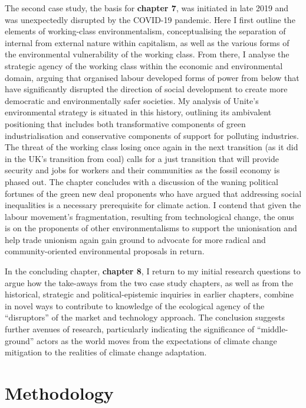 \documentclass[a4paper, nobind]{templates/ociamthesis}
\begin{document}
The second case study, the basis for \textbf{chapter 7}, was initiated in late 2019 and was unexpectedly disrupted by the COVID-19 pandemic. Here I first outline the elements of working-class environmentalism, conceptualising the separation of internal from external nature within capitalism, as well as the various forms of the environmental vulnerability of the working class. From there, I analyse the strategic agency of the working class within the economic and environmental domain, arguing that organised labour developed forms of power from below that have significantly disrupted the direction of social development to create more democratic and environmentally safer societies. My analysis of Unite's environmental strategy is situated in this history, outlining its ambivalent positioning that includes both transformative components of green industrialisation and conservative components of support for polluting industries. The threat of the working class losing once again in the next transition (as it did in the UK's transition from coal) calls for a just transition that will provide security and jobs for workers and their communities as the fossil economy is phased out. The chapter concludes with a discussion of the waning political fortunes of the green new deal proponents who have argued that addressing social inequalities is a necessary prerequisite for climate action. I contend that given the labour movement's fragmentation, resulting from technological change, the onus is on the proponents of other environmentalisms to support the unionisation and help trade unionism again gain ground to advocate for more radical and community-oriented environmental proposals in return.

In the concluding chapter, \textbf{chapter 8}, I return to my initial research questions to argue how the take-aways from the two case study chapters, as well as from the historical, strategic and political-epistemic inquiries in earlier chapters, combine in novel ways to contribute to knowledge of the ecological agency of the ``disruptors'' of the market and technology approach. The conclusion suggests further avenues of research, particularly indicating the significance of ``middle-ground'' actors as the world moves from the expectations of climate change mitigation to the realities of climate change adaptation.

\hypertarget{methodology}{%
\chapter{Methodology}\label{methodology}}
\end{document}
